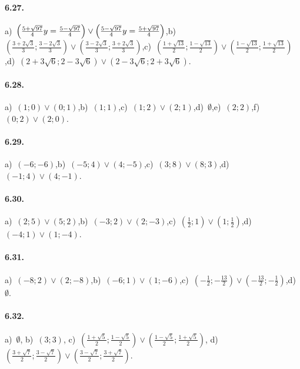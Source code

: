 \paragraph{6.27.} a)~$\left(\frac{5+\sqrt{97}} 4\\y=\frac{5-\sqrt{97}} 4\right)\vee \left(\frac{5-\sqrt{97}} 4\\y=\frac{5+\sqrt{97}} 4\right)$,\quad b)~$\left(\frac{3+{2\sqrt 3}} 3;\frac {3-{2\sqrt 3}} 3\right)\vee \left(\frac {3-{2\sqrt 3}} 3;\frac{3+{2\sqrt 3}} 3\right)$,\quad c)~$\left(\frac{1+\sqrt{13}} 2;\frac{1-\sqrt{13}} 2\right)\vee \left(\frac{1-\sqrt{13}} 2;\frac{1+\sqrt{13}} 2\right)$,\quad d)~$\left(2+3\sqrt 6;2-3\sqrt 6\right)\vee \left(2-3\sqrt 6;2+3\sqrt 6\right)$.

\paragraph{6.28.} a)~$(1;0)\vee(0;1)$,\quad b)~$(1;1)$,\quad c)~$(1;2)\vee(2;1)$,\quad d)~$\emptyset$,\quad e)~$(2;2)$,\quad f)~$(0;2)\vee(2;0)$.

\paragraph{6.29.} a)~$(-6;-6)$,\quad b)~$(-5;4)\vee(4;-5)$,\quad c)~$(3;8)\vee(8;3)$,\quad d)~$(-1;4)\vee(4;-1)$.

\paragraph{6.30.} a)~$(2;5)\vee(5;2)$,\quad b)~$(-3;2)\vee(2;-3)$,\quad c)~$(\frac 1 2;1)\vee(1;\frac 1 2)$,\quad d)~$(-4;1)\vee(1;-4)$.

\paragraph{6.31.} a)~$(-8;2)\vee(2;-8)$,\quad b)~$(-6;1)\vee(1;-6)$,\quad c)~$\left(-\frac 1 2;-\frac{13} 2\right)\vee \left(-\frac{13} 2;-\frac 1 2\right)$,\quad d)~$\emptyset $.

\paragraph{6.32.} a)~$\emptyset $,\; b)~$(3;3)$,\; c)~$\left(\frac{1+\sqrt 5} 2;\frac{1-\sqrt 5} 2\right)\vee \left(\frac{1-\sqrt 5} 2;\frac{1+\sqrt 5} 2\right)$,\; d)~$\left(\frac{3+\sqrt 7} 2;\frac{3-\sqrt 7} 2\right)\vee \left(\frac{3-\sqrt 7} 2;\frac{3+\sqrt 7} 2\right)$.

